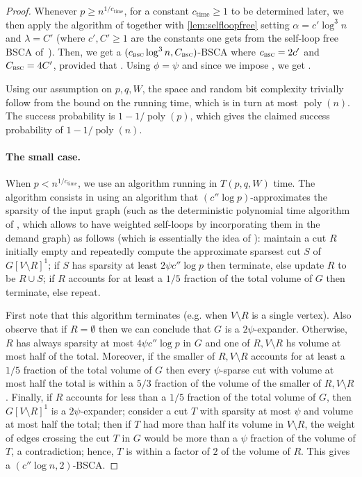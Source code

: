 \documentclass[epsfig,letter,11pt]{article}
\numberwithin{equation}{section}
\DeclareMathOperator*{\poly}{poly}
\DeclareMathOperator*{\sw}{\textsc{bsc}}
\begin{document}
\begin{proof}
Whenever $p \ge n^{1/c_{\text{time}}}$, for a constant $c_{\text{time}} \ge 1$ to be determined later, we then apply the algorithm of \cite{offlineexpdec,liexpdec} together with \cref{lem:selfloopfree} setting $\alpha=c' \log^3 n$ and $\lambda = C'$ (where $c',C'\ge 1$ are the constants one gets from the self-loop free BSCA of~\cite{offlineexpdec,liexpdec}). Then, we get a $(c_{\sw} \log^3 n,C_{\sw})$-BSCA where $c_{\sw}=2c'$ and $C_{\sw} = 4C'$, provided that . Using $\phi = \psi$ and since we impose \smash{$\psi \le  \frac{1}{10 c_{\sw} \log^3 n}$}, we get .

Using our assumption on $p,q,W$, the space and random bit complexity trivially follow from the bound on the running time, which is in turn at most $\poly(n)$. The success probability is $1-1/\poly(p)$, which gives the claimed success probability of $1-1/\poly(n)$.


\paragraph{The small case.}
When $p < n^{1/c_{\text{time}}}$, we use an algorithm running in $T(p,q,W)$ time. The algorithm consists in using an algorithm that $(c'' \log p)$-approximates the sparsity of the input graph (such as the deterministic polynomial time algorithm of \cite{leightonrao,llr}, which allows to have weighted self-loops by incorporating them in the demand graph) as follows (which is essentially the idea of \cite{offlineexpdec}): maintain a cut $R$ initially empty and repeatedly compute the approximate sparsest cut $S$ of $G[V\setminus R]^1$; if $S$ has sparsity at least $2\psi c'' \log p$ then terminate, else update $R$ to be $R \cup S$; if  $R$ accounts for at least a $1/5$ fraction of the total volume of $G$ then terminate, else repeat.

First note that this algorithm terminates (e.g. when $V \setminus R$ is a single vertex). Also observe that if $R = \emptyset$ then we can conclude that $G$ is a $2\psi$-expander. Otherwise, $R$ has always sparsity at most $4\psi c'' \log p$ in $G$ and one of $R,V\setminus R$ hs volume at most half of the total. Moreover, if the smaller of $R,V\setminus R$ accounts for at least a $1/5$ fraction of the total volume of $G$ then every $\psi$-sparse cut with volume at most half the total is within a $5/3$ fraction of the volume of the smaller of $R,V\setminus R$. Finally, if $R$ accounts for less than a $1/5$ fraction of the total volume of $G$, then $G[V\setminus R]^1$ is a $2\psi$-expander; consider a cut $T$ with sparsity at most $\psi$ and volume at most half the total; then if $T$ had more than half its volume in $V \setminus R$, the weight of edges crossing the cut $T$ in $G$ would be more than a $\psi$ fraction of the volume of $T$, a contradiction; hence, $T$ is within a factor of $2$ of the volume of $R$. This gives a $(c'' \log n,2)$-BSCA.


\end{proof}
\end{document}
